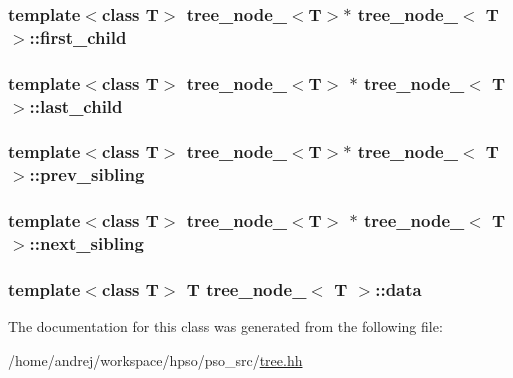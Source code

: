 \hypertarget{classtree__node___d51591496e654515b662095f70d1fc1a}{
\subsubsection{\setlength{\rightskip}{0pt plus 5cm}template$<$class T$>$ {\bf tree\_\-node\_\-}$<$T$>$$\ast$ {\bf tree\_\-node\_\-}$<$ T $>$::{\bf first\_\-child}}}
\label{classtree__node___d51591496e654515b662095f70d1fc1a}


\hypertarget{classtree__node___611d3c41c716dae6bf2012e3d9152933}{
\subsubsection{\setlength{\rightskip}{0pt plus 5cm}template$<$class T$>$ {\bf tree\_\-node\_\-}$<$T$>$ $\ast$ {\bf tree\_\-node\_\-}$<$ T $>$::{\bf last\_\-child}}}
\label{classtree__node___611d3c41c716dae6bf2012e3d9152933}


\hypertarget{classtree__node___e7b8325f91c0b4460552cef6b9aec159}{
\subsubsection{\setlength{\rightskip}{0pt plus 5cm}template$<$class T$>$ {\bf tree\_\-node\_\-}$<$T$>$$\ast$ {\bf tree\_\-node\_\-}$<$ T $>$::{\bf prev\_\-sibling}}}
\label{classtree__node___e7b8325f91c0b4460552cef6b9aec159}


\hypertarget{classtree__node___195a647282d6ab1de50d9ac87aa42bce}{
\subsubsection{\setlength{\rightskip}{0pt plus 5cm}template$<$class T$>$ {\bf tree\_\-node\_\-}$<$T$>$ $\ast$ {\bf tree\_\-node\_\-}$<$ T $>$::{\bf next\_\-sibling}}}
\label{classtree__node___195a647282d6ab1de50d9ac87aa42bce}


\hypertarget{classtree__node___4c15077a3ad0552413d1268ee4be1bef}{
\subsubsection{\setlength{\rightskip}{0pt plus 5cm}template$<$class T$>$ T {\bf tree\_\-node\_\-}$<$ T $>$::{\bf data}}}
\label{classtree__node___4c15077a3ad0552413d1268ee4be1bef}




The documentation for this class was generated from the following file:\begin{CompactItemize}
\item 
/home/andrej/workspace/hpso/pso\_\-src/\hyperlink{tree_8hh}{tree.hh}\end{CompactItemize}
